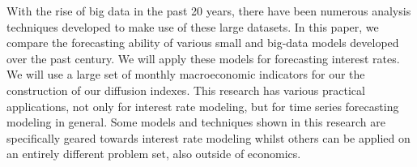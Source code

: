 With the rise of big data in the past 20 years, there have been numerous analysis techniques developed to make use of these large datasets. In this paper, we compare the forecasting ability of various small and big-data models developed over the past century. We will apply these models for forecasting interest rates. We will use a large set of monthly macroeconomic indicators for our the construction of our diffusion indexes. This research has various practical applications, not only for interest rate modeling, but for time series forecasting modeling in general. Some models and techniques shown in this research are specifically geared towards interest rate modeling whilst others can be applied on an entirely different problem set, also outside of economics. 